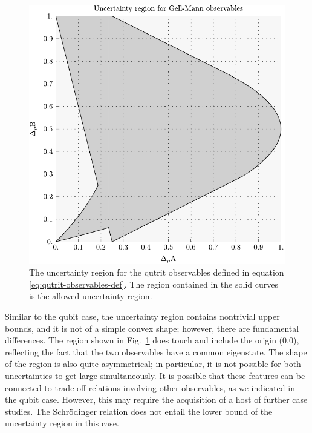 \begin{figure}[ht]\centering
  \includegraphics[width=\textwidth]{figs/full-gellmann-ur-square}
  \caption[The uncertainty region for the qutrit observables defined in equation \eqref{eq:qutrit-observables-def}]{The uncertainty region for the qutrit observables defined in equation \eqref{eq:qutrit-observables-def}. The region contained in the solid curves is the allowed uncertainty region.}
  \label{fig:qutrit-uncertainty-region}
\end{figure}


Similar to the qubit case, the uncertainty region contains nontrivial upper bounds, and it is not of a simple convex shape; however, there are fundamental differences. The region shown in Fig.~\ref{fig:qutrit-uncertainty-region} does touch and include the origin (0,0), reflecting the fact that the two observables have a common eigenstate. The shape of the region is also quite asymmetrical; in particular, it is not possible for both uncertainties to get large simultaneously. It is possible that these features can be connected to trade-off relations involving other observables, as we indicated in the qubit case. However, this may require the acquisition of a host of further case studies.
The Schr\"odinger relation does not entail the lower bound of the uncertainty region in this case. 


